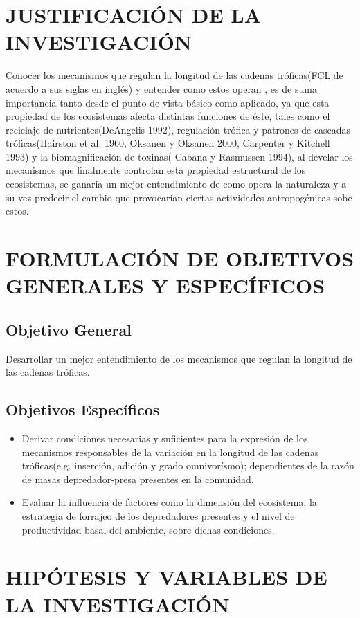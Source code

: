 \documentclass[a4paper,12pt]{article}
\begin{document}
\section{JUSTIFICACI\'ON DE LA INVESTIGACI\'ON}
Conocer los mecanismos que regulan la longitud de las cadenas tr\'oficas(FCL de acuerdo a sus siglas en ingl\'es) y entender como estos operan , es de suma importancia tanto desde el punto de vista b\'asico como aplicado, ya que esta propiedad de los ecosistemas afecta distintas funciones de \'este, tales como el reciclaje de nutrientes(DeAngelis 1992), regulaci\'on tr\'ofica y patrones de cascadas tr\'oficas(Hairston et al. 1960, Oksanen y Oksanen 2000, Carpenter y Kitchell 1993) y la biomagnificaci\'on de toxinas( Cabana y Rasmussen 1994), al develar los mecanismos que finalmente controlan esta propiedad estructural de los ecosistemas, se ganar\'ia un mejor entendimiento de como opera la naturaleza y a su vez predecir el cambio que provocar\'ian ciertas actividades antropog\'enicas sobe estos.

\section{FORMULACI\'ON DE OBJETIVOS GENERALES Y ESPEC\'IFICOS}
\subsection{Objetivo General}
Desarrollar un mejor entendimiento de los mecanismos que regulan la longitud de las cadenas tr\'oficas.
\subsection{Objetivos Espec\'ificos}
\begin{itemize}
\item Derivar condiciones necesarias y suficientes para la expresi\'on de los mecanismos responsables de la variaci\'on en la longitud de las cadenas tr\'oficas(e.g. inserci\'on, adici\'on y  grado omnivor\'ismo); dependientes de la raz\'on de masas depredador-presa presentes en la comunidad.
\item Evaluar la influencia de factores como la dimensi\'on del ecosistema, la estrategia de forrajeo de los depredadores presentes y el nivel de productividad basal del ambiente, sobre dichas condiciones.
\end{itemize}
\section{HIP\'OTESIS Y VARIABLES DE LA INVESTIGACI\'ON}
\end{document}

